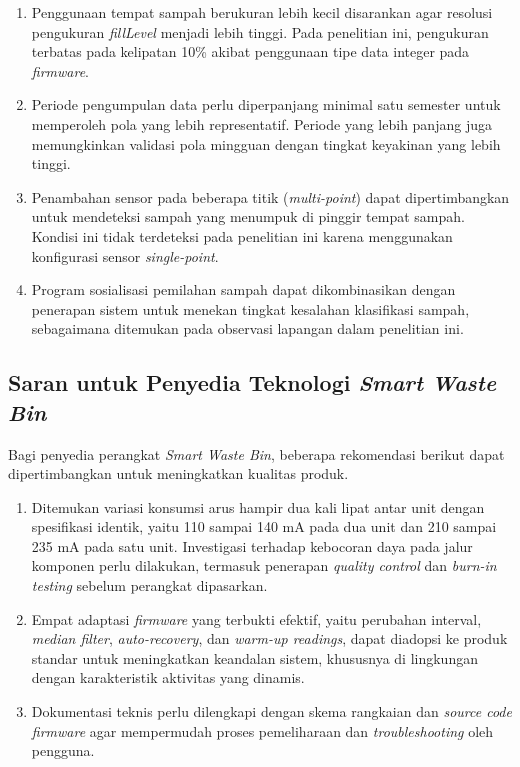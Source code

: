 \begin{enumerate}
  \item Penggunaan tempat sampah berukuran lebih kecil disarankan agar resolusi pengukuran \textit{fillLevel} menjadi lebih tinggi. Pada penelitian ini, pengukuran terbatas pada kelipatan 10\% akibat penggunaan tipe data integer pada \textit{firmware}.

  \item Periode pengumpulan data perlu diperpanjang minimal satu semester untuk memperoleh pola yang lebih representatif. Periode yang lebih panjang juga memungkinkan validasi pola mingguan dengan tingkat keyakinan yang lebih tinggi.

  \item Penambahan sensor pada beberapa titik (\textit{multi-point}) dapat dipertimbangkan untuk mendeteksi sampah yang menumpuk di pinggir tempat sampah. Kondisi ini tidak terdeteksi pada penelitian ini karena menggunakan konfigurasi sensor \textit{single-point}.

  \item Program sosialisasi pemilahan sampah dapat dikombinasikan dengan penerapan sistem untuk menekan tingkat kesalahan klasifikasi sampah, sebagaimana ditemukan pada observasi lapangan dalam penelitian ini.
\end{enumerate}

\subsection{Saran untuk Penyedia Teknologi \textit{Smart Waste Bin}}

Bagi penyedia perangkat \textit{Smart Waste Bin}, beberapa rekomendasi berikut dapat dipertimbangkan untuk meningkatkan kualitas produk.

\begin{enumerate}
  \item Ditemukan variasi konsumsi arus hampir dua kali lipat antar unit dengan spesifikasi identik, yaitu 110 sampai 140 mA pada dua unit dan 210 sampai 235 mA pada satu unit. Investigasi terhadap kebocoran daya pada jalur komponen perlu dilakukan, termasuk penerapan \textit{quality control} dan \textit{burn-in testing} sebelum perangkat dipasarkan.

  \item Empat adaptasi \textit{firmware} yang terbukti efektif, yaitu perubahan interval, \textit{median filter}, \textit{auto-recovery}, dan \textit{warm-up readings}, dapat diadopsi ke produk standar untuk meningkatkan keandalan sistem, khususnya di lingkungan dengan karakteristik aktivitas yang dinamis.

  \item Dokumentasi teknis perlu dilengkapi dengan skema rangkaian dan \textit{source code firmware} agar mempermudah proses pemeliharaan dan \textit{troubleshooting} oleh pengguna.
\end{enumerate}